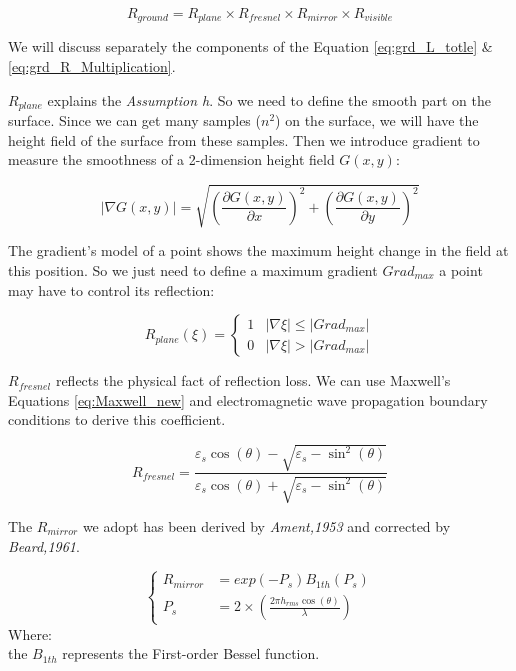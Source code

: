 \documentclass{mcmthesis}
\begin{document}
    \begin{equation}\label{eq:grd_R_Multiplication}
      R_{ground} = R_{plane} \times R_{fresnel} \times R_{mirror} \times R_{visible}
    \end{equation}

    We will discuss separately the components of the Equation \ref{eq:grd_L_totle} \& \ref{eq:grd_R_Multiplication}.

    $R_{plane}$ explains the \emph{Assumption h}. So we need to define the smooth part on the surface. Since we can get many samples ($n^2$) on the surface, we will have the height field of the surface from these samples. Then we introduce gradient to measure the smoothness of a 2-dimension height field $G(x,y)$:

      \begin{equation}\label{eq:gradient}
        |\nabla G(x,y)| = \sqrt{(\frac{\partial G(x,y)}{\partial x})^2 + (\frac{\partial G(x,y)}{\partial y})^2}
      \end{equation}

    The gradient's model of a point shows the maximum height change in the field at this position. So we just need to define a maximum gradient $Grad_{max}$ a point may have to control its reflection:

      \begin{equation}\label{eq:R_plane}
        R_{plane}(\xi) =
        \begin{cases}
          1&\text{$|\nabla \xi| \leq |Grad_{max}|$}\\
          0&\text{$|\nabla \xi| > |Grad_{max}|$}
        \end{cases}
      \end{equation}

    $R_{fresnel}$ reflects the physical fact of reflection loss. We can use Maxwell's Equations \ref{eq:Maxwell_new} and electromagnetic wave propagation boundary conditions to derive this coefficient\cite{hainan}.

      \begin{equation}\label{eq:R_Fesnel}
        R_{fresnel} = \frac{\varepsilon_s \cos(\theta) - \sqrt{\varepsilon_s - \sin^2(\theta)}}{\varepsilon_s \cos(\theta) + \sqrt{\varepsilon_s - \sin^2(\theta)}}
      \end{equation}

    The $R_{mirror}$ we adopt has been derived by \emph{Ament,1953}\cite{ament1953toward} and corrected by \emph{Beard,1961}\cite{beard1961coherent}.

    \begin{equation}\label{eq:R_mirror}
    \left\{
    \begin{aligned}
        R_{mirror} &= exp(- P_s) B_{1th}(P_s) \\
        P_s &= 2 \times (\frac{2\pi h_{rms} \cos(\theta)}{\lambda})
    \end{aligned}
    \right.
    \end{equation}
    Where:\\
    the $B_{1th}$ represents the First-order Bessel function.\\
\end{document}
